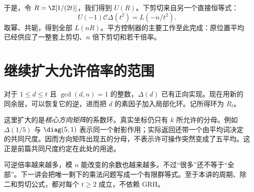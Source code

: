 于是，令 $R=\Z[1/(2t)]$，我们得到 $U(R)$。下剪切来自另一个直接恒等式：
\[U(-1)\mathcal C\Delta(t^2)=L(-n/t^2).
\]
取幂、共轭，得到全部 $L(nR)$。平方控制器的主要工作至此完成：原位置平均已经供应了一整套上剪切、$n$ 倍下剪切和若干倍率。

\section{继续扩大允许倍率的范围}
对于 $1\le d\le t$ 且 $\gcd(d,n)=1$ 的整数，$\Delta(d)$ 已有正向实现。现在用新的同余层，可以恢复它的逆，进而把 $d$ 的素因子加入局部化环。记所得环为 $R_t$。

这里扩大的是\emph{核心方向矩阵}的系数环。真实坐标仍只有 $k$ 所允许的分母。例如 $\Delta(1/5)$ 与 $\diag(5,1)$ 表示同一个射影作用；实际返回还带一个由平均词决定的共同尺度。因而方向矩阵出现五的分母，不表示许可操作突然变成了五平均。这正是前篇共同尺度约定在此处的用途。

可逆倍率越来越多，模 $n$ 能改变的余数也越来越多。不过“很多”还不等于“全部”。下一讲会把唯一剩下的乘法问题写成一个有限群等式。至于本讲的周期、除二和剪切公式，都对每个 $t\ge2$ 成立，不依赖 GRH。
